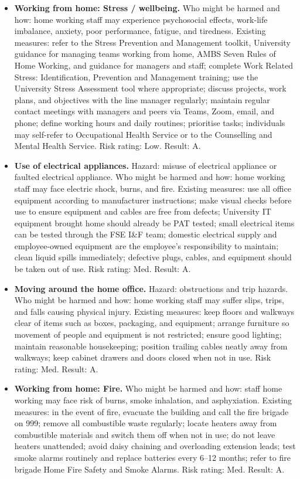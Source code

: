 \begin{uomappendix}
{\begin{itemize}[leftmargin=*]
\item \textbf{Working from home: Stress / wellbeing.} Who might be harmed and how: home working staff may experience psychosocial effects, work-life imbalance, anxiety, poor performance, fatigue, and tiredness. Existing measures: refer to the Stress Prevention and Management toolkit, University guidance for managing teams working from home, AMBS Seven Rules of Home Working, and guidance for managers and staff; complete Work Related Stress: Identification, Prevention and Management training; use the University Stress Assessment tool where appropriate; discuss projects, work plans, and objectives with the line manager regularly; maintain regular contact meetings with managers and peers via Teams, Zoom, email, and phone; define working hours and daily routines; prioritise tasks; individuals may self-refer to Occupational Health Service or to the Counselling and Mental Health Service. Risk rating: Low. Result: A.

\item \textbf{Use of electrical appliances.} Hazard: misuse of electrical appliance or faulted electrical appliance. Who might be harmed and how: home working staff may face electric shock, burns, and fire. Existing measures: use all office equipment according to manufacturer instructions; make visual checks before use to ensure equipment and cables are free from defects; University IT equipment brought home should already be PAT tested; small electrical items can be tested through the FSE I\&F team; domestic electrical supply and employee-owned equipment are the employee's responsibility to maintain; clean liquid spills immediately; defective plugs, cables, and equipment should be taken out of use. Risk rating: Med. Result: A.

\item \textbf{Moving around the home office.} Hazard: obstructions and trip hazards. Who might be harmed and how: home working staff may suffer slips, trips, and falls causing physical injury. Existing measures: keep floors and walkways clear of items such as boxes, packaging, and equipment; arrange furniture so movement of people and equipment is not restricted; ensure good lighting; maintain reasonable housekeeping; position trailing cables neatly away from walkways; keep cabinet drawers and doors closed when not in use. Risk rating: Med. Result: A.

\item \textbf{Working from home: Fire.} Who might be harmed and how: staff home working may face risk of burns, smoke inhalation, and asphyxiation. Existing measures: in the event of fire, evacuate the building and call the fire brigade on 999; remove all combustible waste regularly; locate heaters away from combustible materials and switch them off when not in use; do not leave heaters unattended; avoid daisy chaining and overloading extension leads; test smoke alarms routinely and replace batteries every 6--12 months; refer to fire brigade Home Fire Safety and Smoke Alarms. Risk rating: Med. Result: A.
\end{itemize}

}
\end{uomappendix}
